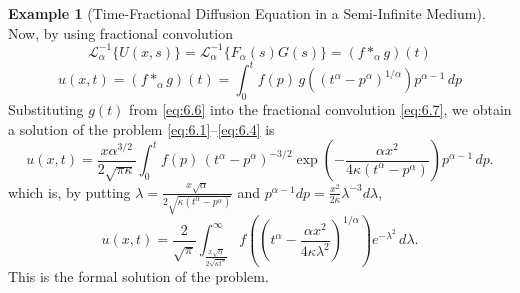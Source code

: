\documentclass[two side,reqno,12pt]{amsart}
\numberwithin{equation}{section}
\theoremstyle{definition}
\newtheorem{example}[lemma]{Example}
\begin{document}
\begin{example}[Time-Fractional Diffusion Equation in a Semi-Infinite Medium]
\begin{equation}
\end{equation}
Now, by using fractional convolution
\[
   \mathcal{L}_{\alpha}^{-1}\{U(x,s)\}=\mathcal{L}_{\alpha}^{-1}\{F_{\alpha}(s) G(s)\} = (f *_{\alpha} g)(t) 
\]
\begin{equation}
   u(x,t)=(f *_{\alpha} g)(t) = \int_{0}^{t} f(p) \, g\!\left( (t^{\alpha} - p^{\alpha})^{1/\alpha} \right) p^{\alpha-1} \, dp 
   \label{eq:6.7}
\end{equation}
Substituting \( g(t) \) from \eqref{eq:6.6} into the fractional convolution \eqref{eq:6.7}, we obtain a solution of the problem \eqref{eq:6.1}--\eqref{eq:6.4} is
\[
    u(x,t) = \frac{x\alpha^{3/2}}{2\sqrt{\pi \kappa}} \int_{0}^{t} f(p) \, (t^{\alpha} - p^{\alpha})^{-3/2}
\exp\!\left( -\frac{\alpha x^{2}}{4\kappa (t^{\alpha} - p^{\alpha})} \right) p^{\alpha-1} \, dp.
\]
which is, by putting 
$\lambda = \frac{x \sqrt{\alpha}}{2 \sqrt{\kappa (t^{\alpha} - p^{\alpha})}}$ and $p^{\alpha-1} dp = \frac{x^{2}}{2 \kappa} \lambda^{-3} d\lambda$,
\[
    u(x,t) = \frac{2}{\sqrt{\pi}} \int_{\frac{x\sqrt{\alpha}}{2\sqrt{\kappa t^{\alpha}}}}^{\infty} f\!\left( \left( t^{\alpha} - \frac{\alpha x^{2}}{4\kappa \lambda^{2}} \right)^{1/\alpha} \right) e^{-\lambda^{2}} \, d\lambda.
\]
This is the formal solution of the problem.
\end{example}
\end{document}
